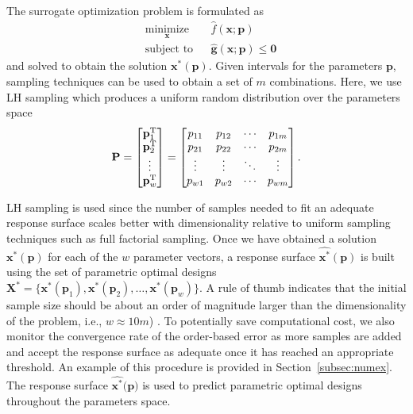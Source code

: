 The surrogate optimization problem is formulated as
\begin{equation}
	\begin{aligned}
		& \underset{\mathbf{x}}{\text{minimize}}
		& & \hat{f}(\mathbf{x};{\mathbf{p}})\\
		& \text{subject to}
		& & \hat{\mathbf{g}}(\mathbf{x};{\mathbf{p}}) \le \mathbf{0}
	\end{aligned}
	\label{eq:SBDoptproblem}
\end{equation}
and solved to obtain the solution $\mathbf{x}^*({\mathbf{p}})$. Given intervals for the parameters $\mathbf{p}$, sampling techniques can be used to obtain a set of $m$ combinations. Here, we use \ac{LH} sampling which produces a uniform random distribution over the parameters space \cite{McKay1979}
\begin{equation}
	 {\mathbf{P}} = \begin{bmatrix}
	 	\mathbf{p}_{1}^{\text T} \\ 
	 	\mathbf{p}_{2}^{\text T} \\ 
	 	\vdots \\ 
	 	\mathbf{p}_{w}^{\text T}
	\end{bmatrix} = \begin{bmatrix}
	 	p_{11} & p_{12} & \cdots & p_{1m}\\ 
	 	p_{21} & p_{22} & \cdots & p_{2m}\\ 
	 	\vdots & \vdots & \ddots & \vdots\\ 
	 	p_{w1} & p_{w2} & \cdots & p_{wm}
	\end{bmatrix}.
\end{equation}

\ac{LH} sampling is used since the number of samples needed to fit an adequate response surface scales better with dimensionality relative to uniform sampling techniques such as full factorial sampling. Once we have obtained a solution $\mathbf{x}^*({\mathbf{p}})$ for each of the $w$ parameter vectors, a response surface $\hat{\mathbf{x}^*}(\mathbf{p})$ is built using the set of parametric optimal designs $\mathbf{X}^*=  \{ \mathbf{x}^*(\mathbf{p}_1),\mathbf{x}^*(\mathbf{p}_2),\ldots,\mathbf{x}^*(\mathbf{p}_w) \}$. A rule of thumb indicates that the initial sample size should be about an order of magnitude larger than the dimensionality of the problem, i.e., $w \approx 10m$) \cite{Loeppky2008}. To potentially save computational cost, we also monitor the convergence rate of the order-based error as more samples are added and accept the response surface as adequate once it has reached an appropriate threshold. An example of this procedure is provided in Section~\ref{subsec:numex}. The response surface $\hat{\mathbf{x}^*}(\mathbf{p)}$ is used to predict parametric optimal designs throughout the parameters space.

